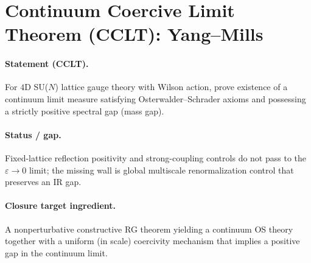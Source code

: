 \section{Continuum Coercive Limit Theorem (CCLT): Yang--Mills}

\paragraph{Statement (CCLT).}
For $4$D SU($N$) lattice gauge theory with Wilson action, prove existence of a continuum limit measure satisfying
Osterwalder--Schrader axioms and possessing a strictly positive spectral gap (mass gap).

\paragraph{Status / gap.}
Fixed-lattice reflection positivity and strong-coupling controls do not pass to the $\varepsilon\to 0$ limit;
the missing wall is global multiscale renormalization control that preserves an IR gap.

\paragraph{Closure target ingredient.}
A nonperturbative constructive RG theorem yielding a continuum OS theory together with a uniform (in scale) coercivity
mechanism that implies a positive gap in the continuum limit.

